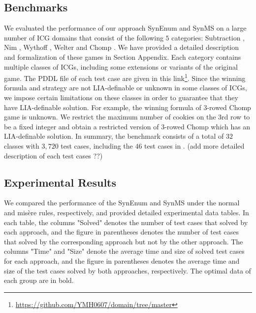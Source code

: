 \documentclass[review]{elsarticle}
\begin{document}
\subsection{Benchmarks}
We evaluated the performance of our approach SynEnum and SynMS on a large number of ICG domains that consist of the following $5$ categories: Subtraction \cite{Yag2001}, Nim \cite{Bou1901}, Wythoff \cite{Wyt1907}, Welter \cite{Wel1952} and Chomp \cite{Sch1952}.
We have provided a detailed description and formalization of these games in Section Appendix.
Each category contains multiple classes of ICGs, including some extensions or variants of the original game.
The PDDL file of each test case are given in this link\footnote{\url{https://github.com/YMH0607/domain/tree/master}}.
Since the winning formula and strategy are not LIA-definable or unknown in some classes of ICGs, we impose certain limitations on these classes in order to guarantee that they have LIA-definable solution.
For example, the winning formula of 3-rowed Chomp game is unknown.
We restrict the maximum number of cookies on the 3rd row to be a fixed integer and obtain a restricted version of 3-rowed Chomp which has an LIA-definable solution.
In summary, the benchmark consists of a total of $32$ classes with $3,720$ test cases, including the $46$ test cases in \cite{WuFXLQCR2020}.  
(add more detailed description of each test cases ??)

\subsection{Experimental Results}
We compared the performance of the SynEnum and SynMS under the normal and mis\`{e}re rules, respectively, and provided detailed experimental data tables. In each table,
the columns "Solved" denotes the number of test cases that solved by each approach, and the figure in parentheses denotes the number of test cases that solved by the corresponding approach but not by the other approach.
The columns "Time" and "Size" denote the average time and size of solved test cases for each approach, and the figure in parentheses denotes the average time and size of the test cases solved by both approaches, respectively.
The optimal data of each group are in bold.
\end{document}
